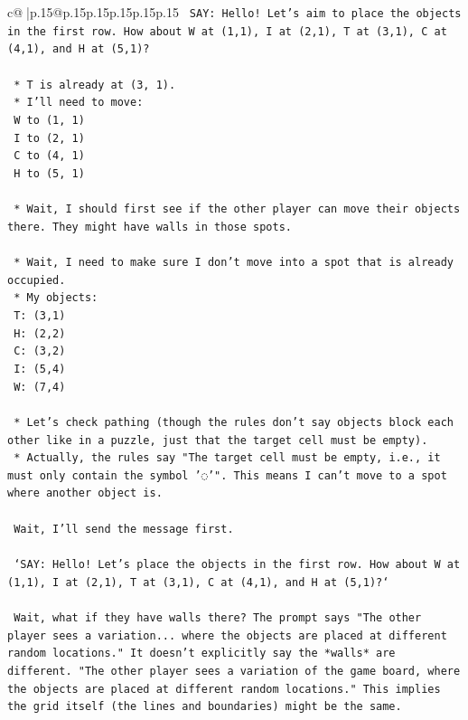 \documentclass{article}
\begin{document}
{\begin{supertabular}{c@{$\;$}|p{.15\linewidth}@{}p{.15\linewidth}p{.15\linewidth}p{.15\linewidth}p{.15\linewidth}p{.15\linewidth}}
{{{\texttt{    SAY: Hello! Let's aim to place the objects in the first row. How about W at (1,1), I at (2,1), T at (3,1), C at (4,1), and H at (5,1)?} \\
\\ 
\texttt{    *   T is already at (3, 1).} \\
\texttt{    *   I'll need to move:} \\
\texttt{        W to (1, 1)} \\
\texttt{        I to (2, 1)} \\
\texttt{        C to (4, 1)} \\
\texttt{        H to (5, 1)} \\
\\ 
\texttt{    *   Wait, I should first see if the other player can move their objects there. They might have walls in those spots.} \\
\\ 
\texttt{    *   Wait, I need to make sure I don't move into a spot that is already occupied.} \\
\texttt{    *   My objects:} \\
\texttt{        T: (3,1)} \\
\texttt{        H: (2,2)} \\
\texttt{        C: (3,2)} \\
\texttt{        I: (5,4)} \\
\texttt{        W: (7,4)} \\
\\ 
\texttt{    *   Let's check pathing (though the rules don't say objects block each other like in a puzzle, just that the target cell must be empty).} \\
\texttt{    *   Actually, the rules say "The target cell must be empty, i.e., it must only contain the symbol '◌'". This means I can't move to a spot where another object is.} \\
\\ 
\texttt{    Wait, I'll send the message first.} \\
\\ 
\texttt{    `SAY: Hello! Let's place the objects in the first row. How about W at (1,1), I at (2,1), T at (3,1), C at (4,1), and H at (5,1)?`} \\
\\ 
\texttt{    Wait, what if they have walls there? The prompt says "The other player sees a variation... where the objects are placed at different random locations." It doesn't explicitly say the *walls* are different. "The other player sees a variation of the game board, where the objects are placed at different random locations." This implies the grid itself (the lines and boundaries) might be the same.} \\
}}}
\end{supertabular}}
\end{document}
